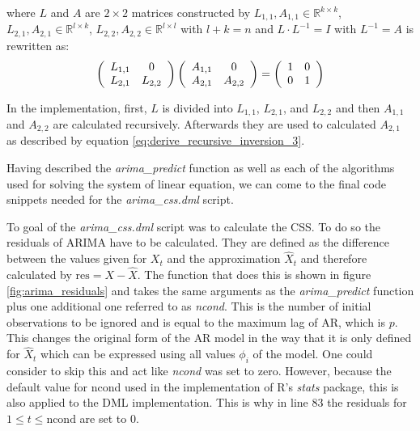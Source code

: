 where $L$ and $A$ are $2 \times 2$ matrices constructed by $L_{1,1}, A_{1,1} \in \mathbb{R}^{k \times k}$, $L_{2,1}, A_{2,1} \in \mathbb{R}^{l \times k}$, $L_{2,2}, A_{2,2} \in \mathbb{R}^{l \times l}$ with $l+k=n$ and $L \cdot L^{-1} = I$ with $L^{-1} = A$ is rewritten as:
\begin{equation*}
   \left(\begin{array}[c]{cc}
        L_{1,1} & 0\\
        L_{2,1} & L_{2,2}
    \end{array}\right) 
    \left(\begin{array}[c]{cc}
        A_{1,1} & 0\\
        A_{2,1} & A_{2,2}
    \end{array}\right) 
    = 
    \left(\begin{array}[c]{cc}
        1 & 0\\
        0 & 1
    \end{array}\right)
\end{equation*}

In the implementation, first, $L$ is divided into $L_{1,1}$, $L_{2,1}$, and $L_{2,2}$ and then $A_{1,1}$ and $A_{2,2}$ are calculated recursively. Afterwards they are used to calculated $A_{2,1}$ as described by equation \ref{eq:derive_recursive_inversion_3}.

Having described the \textit{arima\_predict} function as well as each of the algorithms used for solving the system of linear equation, we can come to the final code snippets needed for the \textit{arima\_css.dml} script.

To goal of the \textit{arima\_css.dml} script was to calculate the \acl{CSS}. To do so the residuals of \acs{ARIMA} have to be calculated. They are defined as the difference between the values given for $X_t$ and the approximation $\hat{X}_t$ and therefore calculated by $\textrm{res} = X - \hat{X}$. The function that does this is shown in figure \ref{fig:arima_residuals} and takes the same arguments as the \textit{arima\_predict} function plus one additional one referred to as \textit{ncond}. This is the number of initial observations to be ignored and is equal to the maximum lag of \acs{AR}, which is $p$. This changes the original form of the \acs{AR} model in the way that it is only defined for $\hat{X}_t$ which can be expressed using all values $\phi_i$ of the model. One could consider to skip this and act like \textit{ncond} was set to zero. However, because the default value for ncond used in the implementation of R's \textit{stats} package, this is also applied to the \acs{DML} implementation. This is why in line 83 the residuals for $1 \leq t \leq  \textrm{ncond}$ are set to 0.

